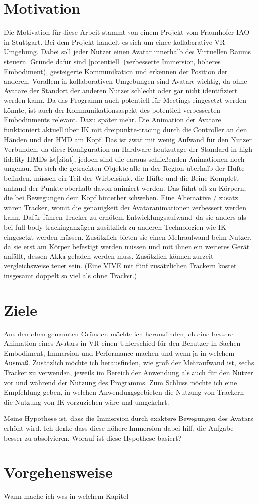 \section{Motivation}
Die Motivation für diese Arbeit stammt von einem Projekt vom Fraunhofer IAO in Stuttgart. Bei dem Projekt handelt es sich um einee kollaborative VR-Umgebung. Dabei soll jeder Nutzer einen Avatar innerhalb des Virtuellen Raums steuern. 
Gründe dafür sind [potentiell] (verbesserte Immersion, höheres Embodiment), gesteigerte Kommunikation und erkennen der Position der anderen.
 Vorallem in kollaborativen Umgebungen sind Avatare wichtig, da ohne Avatare der Standort der anderen Nutzer schlecht oder gar nicht identifiziert werden kann. Da das Programm auch potentiell für Meetings eingesetzt werden könnte, ist auch der Kommunikationsaspekt des potentiell verbesserten Embodinments relevant. Dazu später mehr.
Die Animation der Avatare funktioniert aktuell über IK mit dreipunkte-tracing durch die Controller an den Händen und der HMD am Kopf. Das ist zwar mit wenig Aufwand für den Nutzer Verbunden, da diese Konfiguration an Hardware heutzutage der Standard in high fidelity HMDs ist[zitat], jedoch sind die daraus schließenden Animationen noch ungenau. Da sich die getrackten Objekte alle in der Region überhalb der Hüfte befinden, müssen ein Teil der Wirbelsäule, die Hüfte und die Beine Komplett anhand der Punkte oberhalb davon animiert werden. Das führt oft zu Körpern, die bei Bewegungen dem Kopf hinterher schweben.
Eine Alternative / zusatz wären Tracker, womit die genauigkeit der Avataranimationen verbessert werden kann. Dafür führen Tracker zu erhötem Entwicklungsaufwand, da sie anders als bei full body trackinganzügen zusätzlich zu anderen Technologien wie IK eingesetzt werden müssen. Zusätzlich bieten sie einen Mehraufwand beim Nutzer, da sie erst am Körper befestigt werden müssen und mit ihnen ein weiteres Gerät anfällt, dessen Akku geladen werden muss. Zusätzlich können zurzeit vergleichsweise teuer sein. 
(Eine VIVE mit fünf zusätzlichen Trackern kostet insgesamt doppelt so viel als ohne Tracker.)


\section{Ziele}
Aus den oben genannten Gründen möchte ich herausfinden, ob eine bessere Animation eines Avatars in VR einen Unterschied für den Benutzer in Sachen Embodiment, Immersion und Performance machen und wenn ja in welchem Ausmaß. 
Zusätzlich möchte ich herausfinden, wie groß der Mehraufwand ist, sechs Tracker zu verwenden, jeweils im Bereich der Anwendung als auch für den Nutzer vor und während der Nutzung des Programms.
Zum Schluss möchte ich eine Empfehlung geben, in welchen Anwendungsgebieten die Nutzung von Trackern die Nutzung von IK vorzuziehen wäre und umgekehrt.

Meine Hypothese ist, dass die Immersion durch exaktere Bewegungen des Avatars erhöht wird. Ich denke dass diese höhere Immersion dabei hilft die Aufgabe besser zu absolvieren.
Worauf ist diese Hypothese basiert?


\section{Vorgehensweise}
Wann mache ich was
in welchem Kapitel
